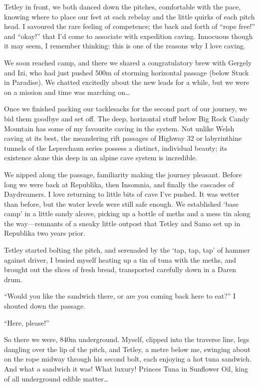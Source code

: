 Tetley in front, we both danced down the pitches, comfortable with the
pace, knowing where to place our feet at each rebelay and the little
quirks of each pitch head. I savoured the rare feeling of competence;
the back and forth of ``rope free!'' and ``okay!'' that I'd come to
associate with expedition caving. Innocuous though it may seem, I
remember thinking: this is one of the reasons why I love caving.

We soon reached camp, and there we shared a congratulatory brew with
Gergely and Izi, who had just pushed 500m of storming horizontal passage
(below Stuck in Paradise). We chatted excitedly about the new leads for
a while, but we were on a mission and time was marching on\ldots{}

Once we finished packing our tacklesacks for the second part of our
journey, we bid them goodbye and set off. The deep, horizontal stuff
below Big Rock Candy Mountain has some of my favourite caving in the
system. Not unlike Welsh caving at its best, the meandering rift
passages of Highway 32 or labyrinthine tunnels of the Leprechaun series
possess a distinct, individual beauty; its existence alone this deep in
an alpine cave system is incredible.

We nipped along the passage, familiarity making the journey pleasant.
Before long we were back at Republika, then Insomnia, and finally the
cascades of Daydreamers. I love returning to little bits of cave I've
pushed. It was wetter than before, but the water levels were still safe
enough. We established `base camp' in a little sandy alcove, picking up
a bottle of meths and a mess tin along the way---remnants of a sneaky
little outpost that Tetley and Samo set up in Republika two years prior.

Tetley started bolting the pitch, and serenaded by the `tap, tap, tap'
of hammer against driver, I busied myself heating up a tin of tuna with
the meths, and brought out the slices of fresh bread, transported
carefully down in a Daren drum.

``Would you like the sandwich there, or are you coming back here to
eat?'' I shouted down the passage.

``Here, please!''

So there we were, 840m underground. Myself, clipped into the traverse
line, legs dangling over the lip of the pitch, and Tetley, a metre below
me, swinging about on the rope midway through his second bolt, each
enjoying a hot tuna sandwich. And what a sandwich it was! What luxury!
Princes Tuna in Sunflower Oil, king of all underground edible
matter\ldots{}

